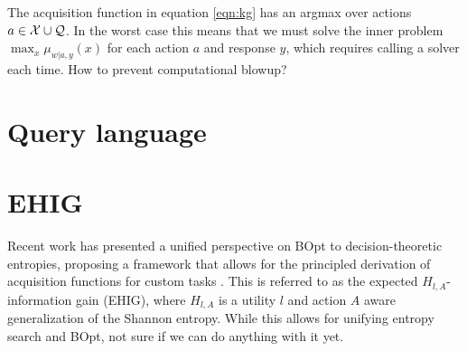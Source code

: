 \documentclass[11pt]{article}
\begin{document}
The acquisition function in equation \ref{eqn:kg} has an argmax over actions $a \in \mathcal{X} \cup \mathcal{Q}$.
In the worst case this means that we must solve the inner problem
$\max_x \mu_{w|a,y}(x)$ for each action $a$ and response $y$,
which requires calling a solver each time.
How to prevent computational blowup?

\section{Query language}




\appendix

\section{EHIG}
Recent work has presented a unified perspective on BOpt to decision-theoretic entropies, proposing a framework that allows for the principled derivation of acquisition functions for custom tasks \citep{neiswanger2022generalizing}.
This is referred to as the expected $H_{l,A}$-information gain (EHIG),
where $H_{l,A}$ is a utility $l$ and action $A$ aware generalization of the Shannon entropy.
While this allows for unifying entropy search and BOpt, not sure if we can do anything with it yet.
\end{document}
